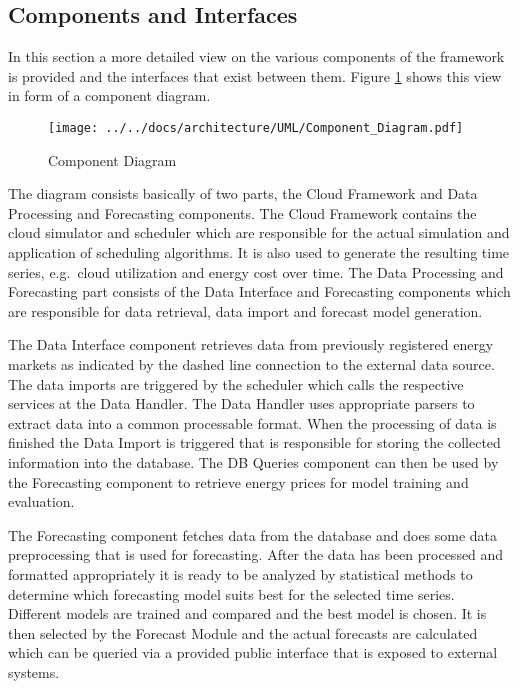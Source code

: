 \subsection{Components and Interfaces}

In this section a more detailed view on the various components of the framework is provided and the interfaces that exist between them. Figure \ref{fig:Component_Diagram} shows this view in form of a component diagram. 

\begin{figure}[htbp]
	\hspace*{-0.4in}
		\texttt{[image: ../../docs/architecture/UML/Component\_Diagram.pdf]}
	\caption{Component Diagram}
	\label{fig:Component_Diagram}
\end{figure}

The diagram consists basically of two parts, the Cloud Framework and Data Processing and Forecasting components. The Cloud Framework contains the cloud simulator and scheduler which are responsible for the actual simulation and application of scheduling algorithms. It is also used to generate the resulting time series, e.g.~cloud utilization and energy cost over time. The Data Processing and Forecasting part consists of the Data Interface and Forecasting components which are responsible for data retrieval, data import and forecast model generation. 

The Data Interface component retrieves data from previously registered energy markets as indicated by the dashed line connection to the external data source. The data imports are triggered by the scheduler which calls the respective services at the Data Handler. The Data Handler uses appropriate parsers to extract data into a common processable format. When the processing of data is finished the Data Import is triggered that is responsible for storing the collected information into the database. The DB Queries component can then be used by the Forecasting component to retrieve energy prices for model training and evaluation. 

The Forecasting component fetches data from the database and does some data preprocessing that is used for forecasting. After the data has been processed and formatted appropriately it is ready to be analyzed by statistical methods to determine which forecasting model suits best for the selected time series. Different models are trained and compared and the best model is chosen. It is then selected by the Forecast Module and the actual forecasts are calculated which can be queried via a provided public interface that is exposed to external systems. 

